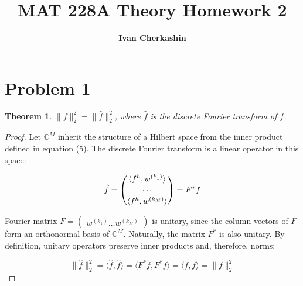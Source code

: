 \documentclass[a4paper]{amsproc}
\title[MAT 228A Theory Homework 2]{MAT 228A Theory Homework 2}
\author[Cherkashin]{\bfseries Ivan Cherkashin}
\theoremstyle{plain}
\newtheorem*{thm}{Theorem}
\theoremstyle{definition}
\theoremstyle{remark}
\numberwithin{equation}{section}
\providecommand{\F}{\begin{pmatrix} w^{(k_1)} \hdots w^{(k_M)} \end{pmatrix}}
\providecommand{\fourier}{\begin{pmatrix} \langle f^h, w^{(k_1)} \rangle \\ \hdots \vspace{1mm} \\ \langle f^h, w^{(k_M)} \rangle \end{pmatrix}}
\begin{document}
\vspace{18mm} \setcounter{page}{1} \thispagestyle{empty}



\maketitle

\section*{Problem 1}

\begin{thm} \label{} 
$\lVert f \rVert^{2}_{2} = \lVert \hat{f} \rVert^{2}_{2}$, where $\hat{f}$ is the discrete Fourier transform of $f$.
\end{thm}

\begin{proof}
Let $\mathbb{C}^M$ inherit the structure of a Hilbert space from the inner product defined in equation (5). The discrete Fourier transform is a linear operator in this space:

\begin{equation}\label{eq:1.1}
\hat{f} = \fourier = F^{*} f
\end{equation}

Fourier matrix $F = \F$ is unitary, since the column vectors of $F$ form an orthonormal basis of $\mathbb{C}^M$. Naturally, the matrix $F^*$ is also unitary. By definition, unitary operators preserve inner products and, therefore, norms:

\begin{equation}\label{eq:1.2}  
 \lVert \hat{f} \rVert^{2}_{2} = \langle \hat{f}, \hat{f} \rangle = \langle F^{*}f, F^{*}f \rangle = \langle f,f \rangle = \lVert f \rVert^{2}_{2} 
\end{equation}

\end{proof}
\end{document}
